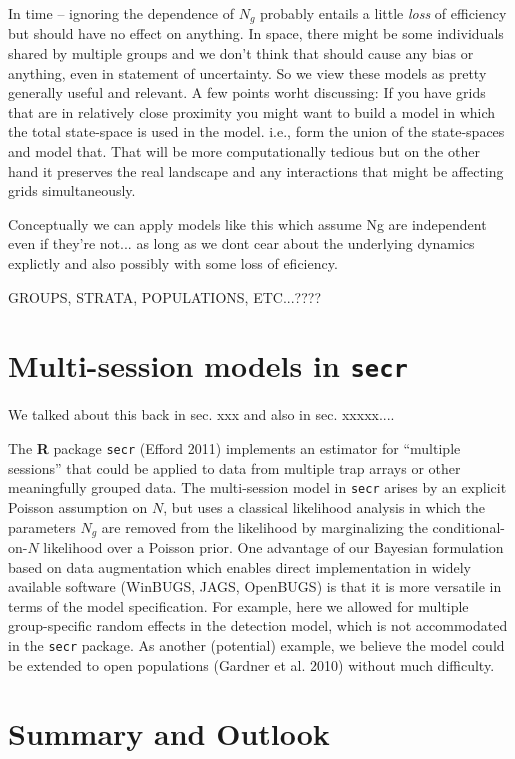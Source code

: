 In time -- ignoring the dependence of $N_{g}$ probably entails a
little {\it loss} of efficiency but should have no effect on anything.
In space, there might be some individuals shared by multiple groups
and we don't think that should cause any bias or anything, even in
statement of uncertainty. So we view these models as pretty generally
useful and relevant.
A few points worht discussing: If you have grids that are in
relatively close proximity you might want to build a model in which
the total state-space is used in the model. i.e., form the union of
the state-spaces and model that. That will be more computationally
tedious but on the other hand it preserves the real landscape and any
interactions that might be affecting grids simultaneously. 

Conceptually we can apply models like this which assume Ng are
independent even if they're not... as long as we dont cear about the
underlying dynamics explictly and also possibly with some loss of
eficiency. 

GROUPS, STRATA, POPULATIONS, ETC...????

\section{Multi-session models in \mbox{\tt secr}  }

We talked about this back in sec. xxx and also in sec. xxxxx....

The {\bf R} package \mbox{\tt secr} (Efford 2011) implements an
estimator for ``multiple sessions'' that could be applied to data from
multiple trap arrays or other meaningfully grouped data.
 The multi-session
model in \mbox{\tt secr} 
arises by an explicit Poisson assumption on $N$, but uses
 a classical likelihood analysis in which the parameters $N_{g}$
are removed from the likelihood by marginalizing the
conditional-on-$N$ likelihood over a Poisson prior.  One advantage of
our Bayesian formulation based on data augmentation which enables
direct implementation in widely available software (WinBUGS, JAGS,
OpenBUGS) is that it is more versatile in terms of the model
specification. For example, here we allowed for multiple
group-specific random effects in the detection model, which is not
accommodated in the \mbox{\tt secr}
package. As another (potential) example, we believe the model could be
extended to open populations (Gardner et al. 2010) without much
difficulty.




\section{Summary and Outlook}


